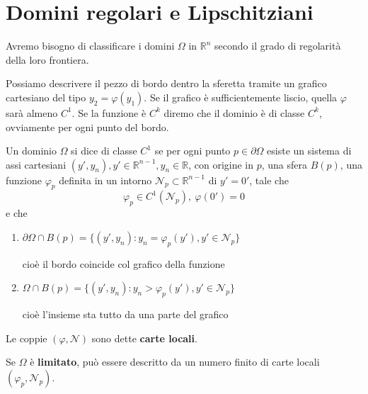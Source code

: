\documentclass[10pt,a4paper,twoside,openright]{book}
\begin{document}
\section{Domini regolari e Lipschitziani}

Avremo bisogno di classificare i domini $\Omega $ in $\mathbb{R}^{n}$ secondo il grado di regolarità della loro frontiera.

Possiamo descrivere il pezzo di bordo dentro la sferetta tramite un grafico cartesiano del tipo $y_{2} =\varphi (y_{1})$. Se il grafico è sufficientemente liscio, quella $\varphi $ sarà almeno $C^{1}$. Se la funzione è $C^{k}$ diremo che il dominio è di classe $C^{k}$, ovviamente per ogni punto del bordo.


\begin{definition}
    Un dominio $\Omega $ si dice di classe $C^{1}$ se per ogni punto $p\in \partial \Omega $ esiste un sistema di assi cartesiani $(y',y_{n}),y'\in \mathbb{R}^{n-1},y_{n} \in \mathbb{R}$, con origine in $p$, una sfera $B(p)$, una funzione $\varphi _{p}$ definita in un intorno $\mathcal{N}_{p} \subset \mathbb{R}^{n-1}$ di $y'=0'$, tale che
    \begin{equation*}
        \varphi _{p} \in C^{1}(\mathcal{N}_{p}),\ \varphi (0') =0
    \end{equation*}
    e che
    \begin{enumerate}
        \item $\partial \Omega \cap B(p) =\{(y',y_{n}) :y_{n} =\varphi _{p}(y'),y'\in \mathcal{N}_{p}\}$

              cioè il bordo coincide col grafico della funzione
        \item $\Omega \cap B(p) =\{(y',y_{n}) :y_{n}  >\varphi _{p}(y'),y'\in \mathcal{N}_{p}\}$

              cioè l'insieme sta tutto da una parte del grafico
    \end{enumerate}
\end{definition}

Le coppie $(\varphi,\mathcal{N})$ sono dette \textbf{carte locali}.

Se $\Omega $ è \textbf{limitato}, può essere descritto da un numero finito di carte locali $(\varphi _{p},\mathcal{N}_{p})$.
\end{document}
